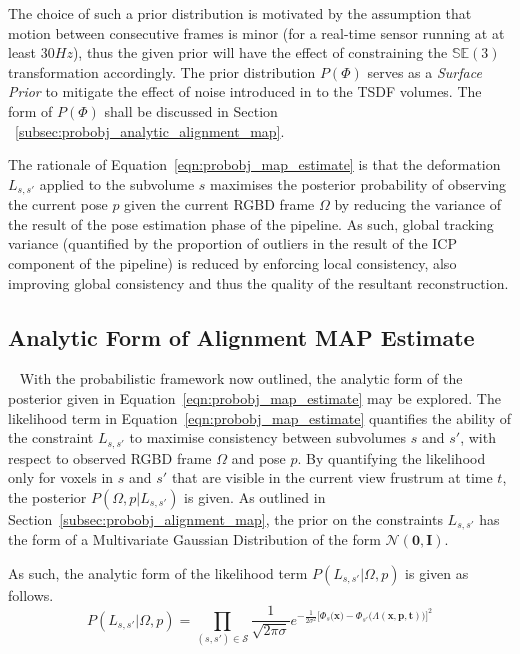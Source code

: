 The choice of such a prior distribution is motivated by the assumption that motion between 
consecutive frames is minor (for a real-time sensor running at at least \( 30Hz \)),
thus the given prior will have the effect of constraining the \(\mathbb{SE}(3)\)
transformation accordingly. The prior distribution \(P(\Phi)\) serves as a
\textit{Surface Prior} to mitigate the effect of noise introduced in to the TSDF
volumes. The form of \(P(\Phi)\) shall be discussed in Section
~\ref{subsec:probobj_analytic_alignment_map}.

The rationale of Equation~\ref{eqn:probobj_map_estimate} is that the deformation
\(L_{s, s'}\) applied to the subvolume \(s\) maximises the posterior probability of
observing the current pose \(p\) given the current RGBD frame \( \Omega \) by reducing
the variance of the result of the pose estimation phase of the pipeline. As such,
global tracking variance (quantified by the proportion of outliers in the result
of the ICP component of the pipeline) is reduced by enforcing local consistency,
also improving global consistency and thus the quality of the resultant
reconstruction.

\subsection{Analytic Form of Alignment MAP Estimate}
~\label{subsec:probobj_analytic_alignment_map}
With the probabilistic framework now outlined, the analytic form of the
posterior given in Equation~\ref{eqn:probobj_map_estimate} may be explored. The
likelihood term in Equation~\ref{eqn:probobj_map_estimate} quantifies the
ability of the constraint \(L_{s, s'}\) to maximise consistency between subvolumes
\(s\) and \(s'\), with respect to observed RGBD frame \( \Omega \) and pose \(p\). By
quantifying the likelihood only for voxels in \(s\) and \(s'\) that are visible in
the current view frustrum at time \(t\), the posterior \(P(\Omega, p | L_{s, s'})\)
is given. As outlined in Section~\ref{subsec:probobj_alignment_map}, the prior
on the constraints \(L_{s, s'}\) has the form of a Multivariate Gaussian
Distribution of the form \(\mathcal{N}(\bm{0}, \bm{I})\).

As such, the analytic form of the likelihood term \(P(L_{s, s'} | \Omega, p)\) is
given as follows.
\begin{equation}
  \label{eqn:probobj_likelihood_analytic}
  P(L_{s, s'} | \Omega, p) = \prod_{(s, s') \in \mathcal{S}}
  \frac{1}{\sqrt{2 \pi \sigma}}
  e^{-\frac{1}{2\sigma^{2}} {\Big[
      \Phi_{s}\big(\bm{x}\big) - \Phi_{s'}\big(\Lambda(\bm{x}, \bm{p}, \bm{t})\big)
    \Big]}^{2}
  }
\end{equation}

